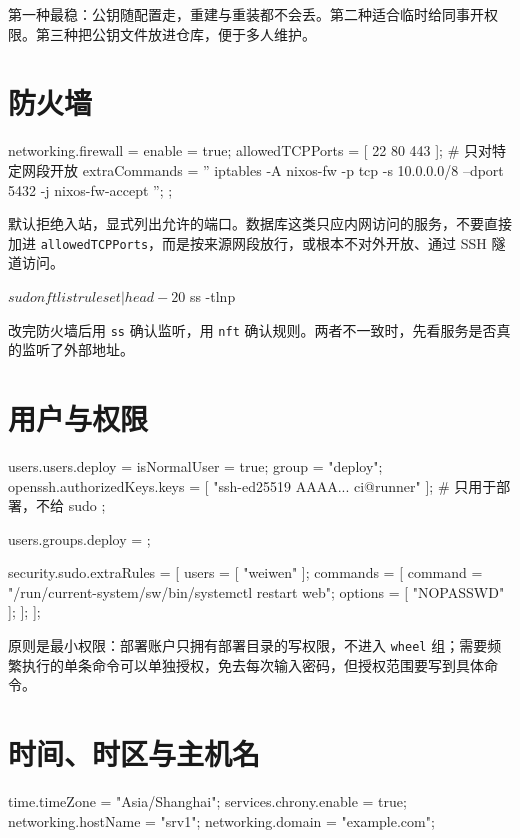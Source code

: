 第一种最稳：公钥随配置走，重建与重装都不会丢。第二种适合临时给同事开权限。第三种把公钥文件放进仓库，便于多人维护。

\section{防火墙}

\begin{nixcode}
networking.firewall = {
  enable = true;
  allowedTCPPorts = [ 22 80 443 ];
  # 只对特定网段开放
  extraCommands = ''
    iptables -A nixos-fw -p tcp -s 10.0.0.0/8 --dport 5432 -j nixos-fw-accept
  '';
};
\end{nixcode}

默认拒绝入站，显式列出允许的端口。数据库这类只应内网访问的服务，不要直接加进 \texttt{allowedTCPPorts}，而是按来源网段放行，或根本不对外开放、通过 SSH 隧道访问。

\begin{shellsession}
$ sudo nft list ruleset | head -20
$ ss -tlnp
\end{shellsession}

改完防火墙后用 \texttt{ss} 确认监听，用 \texttt{nft} 确认规则。两者不一致时，先看服务是否真的监听了外部地址。

\section{用户与权限}

\begin{nixcode}
users.users.deploy = {
  isNormalUser = true;
  group = "deploy";
  openssh.authorizedKeys.keys = [ "ssh-ed25519 AAAA... ci@runner" ];
  # 只用于部署，不给 sudo
};

users.groups.deploy = {};

security.sudo.extraRules = [{
  users = [ "weiwen" ];
  commands = [
    { command = "/run/current-system/sw/bin/systemctl restart web"; options = [ "NOPASSWD" ]; }
  ];
}];
\end{nixcode}

原则是最小权限：部署账户只拥有部署目录的写权限，不进入 \texttt{wheel} 组；需要频繁执行的单条命令可以单独授权，免去每次输入密码，但授权范围要写到具体命令。

\section{时间、时区与主机名}

\begin{nixcode}
time.timeZone = "Asia/Shanghai";
services.chrony.enable = true;
networking.hostName = "srv1";
networking.domain = "example.com";
\end{nixcode}

